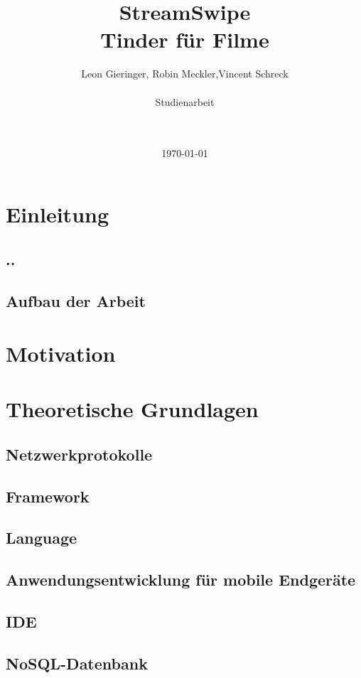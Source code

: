 \documentclass[11pt,a4paper]{article}
\title{StreamSwipe\\Tinder für Filme\vspace{10px}}
\author{Leon Gieringer, Robin Meckler,Vincent Schreck \\ \\ Studienarbeit \\ \\ \\}
\date{\today}
\begin{document}
\maketitle
\thispagestyle{empty}
\newpage
{}
\tableofcontents
\newpage
\listoffigures
\newpage
{}

\pagestyle{fancy}
\fancyhf{}
\setlength{\headheight}{35pt}
\cfoot{\thepage}
\newpage


\section{Einleitung}
\subsection{..}
\subsection{Aufbau der Arbeit}

\section{Motivation}

\newpage
\section{Theoretische Grundlagen}
\subsection{Netzwerkprotokolle}

\newpage
\subsection{Framework}

\subsection{Language}

\subsection{Anwendungsentwicklung für mobile Endgeräte}

\subsection{IDE}

\newpage
\subsection{NoSQL-Datenbank}

\end{document}
